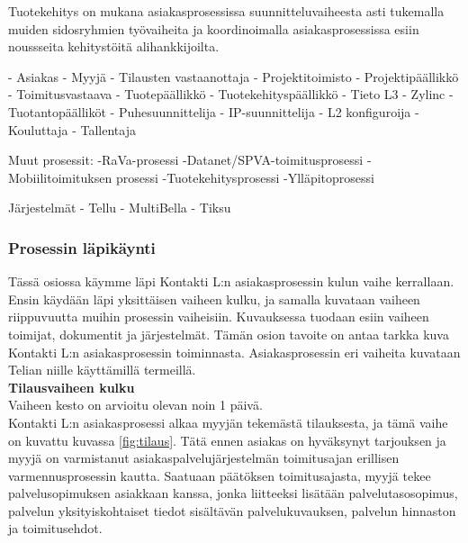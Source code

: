 \documentclass[finnish,12pt,a4paper,pdftex]{article}
\begin{document}
Tuotekehitys on mukana asiakasprosessissa suunnitteluvaiheesta asti tukemalla muiden sidosryhmien työvaiheita ja koordinoimalla asiakasprosessissa esiin noussseita kehitystöitä alihankkijoilta.

 

- Asiakas
- Myyjä
- Tilausten vastaanottaja
- Projektitoimisto
- Projektipäällikkö
- Toimitusvastaava
- Tuotepäällikkö
- Tuotekehityspäällikkö
- Tieto L3
- Zylinc
- Tuotantopäälliköt
- Puhesuunnittelija
- IP-suunnittelija
- L2 konfiguroija
- Kouluttaja
- Tallentaja

Muut prosessit:
-RaVa-prosessi
-Datanet/SPVA-toimitusprosessi
-Mobiilitoimituksen prosessi
-Tuotekehitysprosessi
-Ylläpitoprosessi

Järjestelmät
- Tellu
- MultiBella
- Tiksu
\subsubsection{Prosessin läpikäynti}

Tässä osiossa käymme läpi Kontakti L:n asiakasprosessin kulun vaihe kerrallaan. Ensin käydään läpi yksittäisen vaiheen kulku, ja samalla kuvataan vaiheen riippuvuutta muihin prosessin vaiheisiin. Kuvauksessa tuodaan esiin vaiheen toimijat, dokumentit ja järjestelmät. Tämän osion tavoite on antaa tarkka kuva Kontakti L:n asiakasprosessin toiminnasta. Asiakasprosessin eri vaiheita kuvataan Telian niille käyttämillä termeillä.\\

\textbf{Tilausvaiheen kulku}\\

Vaiheen kesto on arvioitu olevan noin 1 päivä.\\

Kontakti L:n asiakasprosessi alkaa myyjän tekemästä tilauksesta, ja tämä vaihe on kuvattu kuvassa \ref{fig:tilaus}. Tätä ennen asiakas on hyväksynyt tarjouksen ja myyjä on varmistanut asiakaspalvelujärjestelmän toimitusajan erillisen varmennusprosessin kautta. Saatuaan päätöksen toimitusajasta, myyjä tekee palvelusopimuksen asiakkaan kanssa, jonka liitteeksi lisätään palvelutasosopimus, palvelun yksityiskohtaiset tiedot sisältävän palvelukuvauksen, palvelun hinnaston ja toimitusehdot.
\end{document}
